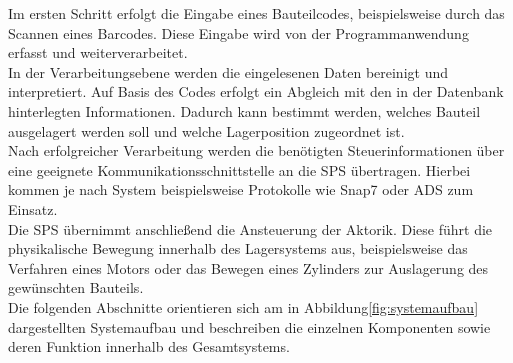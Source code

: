 Im ersten Schritt erfolgt die Eingabe eines Bauteilcodes, beispielsweise durch das Scannen eines Barcodes. Diese Eingabe wird von der Programmanwendung erfasst und weiterverarbeitet.\\

In der Verarbeitungsebene werden die eingelesenen Daten bereinigt und interpretiert. Auf Basis des Codes erfolgt ein Abgleich mit den in der Datenbank hinterlegten Informationen. Dadurch kann bestimmt werden, welches Bauteil ausgelagert werden soll und welche Lagerposition zugeordnet ist.\\

Nach erfolgreicher Verarbeitung werden die benötigten Steuerinformationen über eine geeignete Kommunikationsschnittstelle an die SPS übertragen. Hierbei kommen je nach System beispielsweise Protokolle wie Snap7 oder ADS zum Einsatz.\\

Die SPS übernimmt anschließend die Ansteuerung der Aktorik. Diese führt die physikalische Bewegung innerhalb des Lagersystems aus, beispielsweise das Verfahren eines Motors oder das Bewegen eines Zylinders zur Auslagerung des gewünschten Bauteils.\\

Die folgenden Abschnitte orientieren sich am in Abbildung\ref{fig:systemaufbau} dargestellten Systemaufbau und beschreiben die einzelnen Komponenten sowie deren Funktion innerhalb des Gesamtsystems.
